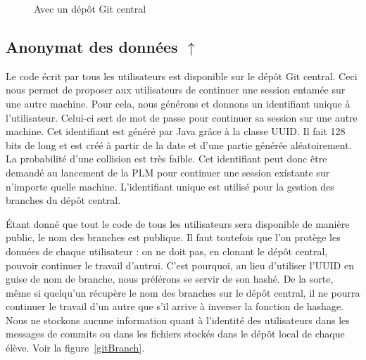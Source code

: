 \begin{figure}[!h]
\begin{center}
	
    \caption{Avec un dépôt Git central}
	\label{fig:gitDistant}
\end{center}
\end{figure}

\subsection[Anonymat des données]{Anonymat des données \hyperref[anonymatPb]{$\uparrow$}}
\label{anonymatSol}

Le code écrit par tous les utilisateurs est disponible sur le dépôt Git central. Ceci nous permet de proposer aux utilisateurs de continuer une session entamée sur une autre machine. Pour cela, nous générons et donnons un identifiant unique à l'utilisateur. Celui-ci sert de mot de passe pour continuer sa session sur une autre machine. Cet identifiant est généré par Java grâce à la classe UUID\cite{UUID}. Il fait 128 bits de long et est créé à partir de la date et d'une partie générée aléatoirement. La probabilité d'une collision est très faible\cite{ietfUUID}. Cet identifiant peut donc être demandé au lancement de la PLM pour continuer une session existante sur n'importe quelle machine. L'identifiant unique est utilisé pour la gestion des branches du dépôt central.

\'Etant donné que tout le code de tous les utilisateurs sera disponible de manière public, le nom des branches est publique. Il faut toutefois que l'on protège les données de chaque utilisateur : on ne doit pas, en clonant le dépôt central, pouvoir continuer le travail d'autrui. C'est pourquoi, au lieu d'utiliser l'UUID en guise de nom de branche, nous préférons se servir de son hashé. De la sorte, même si quelqu'un récupère le nom des branches sur le dépôt central, il ne pourra continuer le travail d'un autre que s'il arrive à inverser la fonction de hashage.
Nous ne stockons aucune information quant à l'identité des utilisateurs dans les messages de commits ou dans les fichiers stockés dans le dépôt local de chaque élève. Voir la figure~\ref{gitBranch}.

